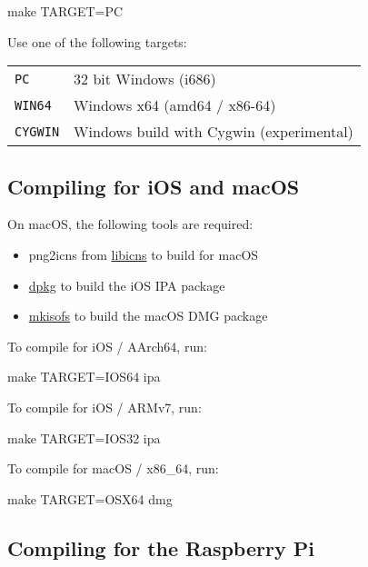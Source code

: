 \begin{verbatim*}
make TARGET=PC
\end{verbatim*}

Use one of the following targets:

\begin{tabularx}{1.9\textwidth}{lX}

\texttt{PC} & 32 bit Windows (i686) \\

\texttt{WIN64} & Windows x64 (amd64 / x86-64) \\

\texttt{CYGWIN} & Windows build with Cygwin (experimental) \\

\end{tabularx}

\subsection{Compiling for iOS and macOS}

On macOS, the following tools are required:
\begin{itemize}
\item png2icns from \href{http://icns.sourceforge.net}{libicns} to build for
  macOS
\item \href{https://alioth.debian.org/projects/dpkg}{dpkg} to build the iOS
  IPA package
\item \href{http://cdrecord.org/private/cdrecord.html}{mkisofs} to build the
  macOS DMG package
\end{itemize}

To compile for iOS / AArch64, run:

\begin{verbatim*}
make TARGET=IOS64 ipa
\end{verbatim*}

To compile for iOS / ARMv7, run:

\begin{verbatim*}
make TARGET=IOS32 ipa
\end{verbatim*}

To compile for macOS / x86\_64, run:

\begin{verbatim*}
make TARGET=OSX64 dmg
\end{verbatim*}

\subsection{Compiling for the Raspberry Pi}

